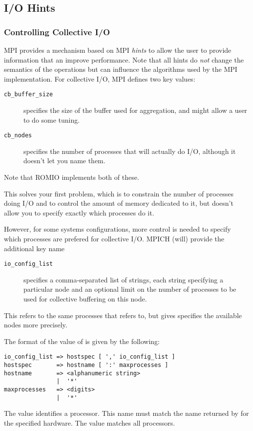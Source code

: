 \subsection{I/O Hints}

\subsubsection{Controlling Collective I/O}

MPI provides a mechanism based on MPI \emph{hints} to allow the user to
provide information that an improve performance.  Note that all hints do
\emph{not} change the semantics of the operations but can influence the
algorithms used by the MPI implementation.  For collective I/O, MPI defines
two  key values:
\begin{description}
\item[\texttt{cb\_buffer\_size}] specifies the size of the buffer used for
  aggregation, and might allow a user to do some tuning.
\item[\texttt{cb\_nodes}]specifies the number of processes that will actually
  do I/O, although it doesn't let you name them.
\end{description}

Note that ROMIO implements both of these.

This solves your first problem, which is to constrain the number of processes
doing I/O and to control the amount of memory dedicated to it, but doesn't
allow you to specify exactly which processes do it.

However, for some systems configurations, more control is needed to specify
which processes are prefered for collective I/O.  MPICH (will) provide the
additional  key name
\begin{description}
\item[\texttt{io\_config\_list}]specifies a comma-separated list of strings,
  each string specifying a particular node and an optional limit on the number
  of processes to be used for collective buffering on this node.  
\end{description}
This refers to the same processes that  refers to, but gives
specifies the available nodes more precisely.

The format of the value of  is given by the following:
\begin{verbatim}
io_config_list => hostspec [ ',' io_config_list ]
hostspec       => hostname [ ':' maxprocesses ]
hostname       => <alphanumeric string>
               |  '*'
maxprocesses   => <digits>
               |  '*'
\end{verbatim}
The value  identifies a processor.  This name must match the
name returned by  for the specified hardware.
The value \code{*} matches all processors.

